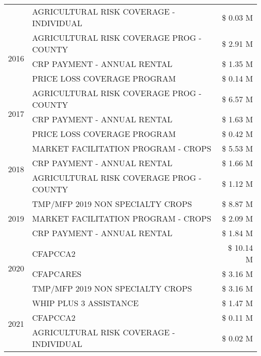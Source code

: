 \begin{tabular}{llr}
 & AGRICULTURAL RISK COVERAGE - INDIVIDUAL & \$ 0.03 M \\
\cline{1-3}
\multirow[t]{3}{*}{2016} & AGRICULTURAL RISK COVERAGE PROG - COUNTY & \$ 2.91 M \\
 & CRP PAYMENT - ANNUAL RENTAL & \$ 1.35 M \\
 & PRICE LOSS COVERAGE PROGRAM & \$ 0.14 M \\
\cline{1-3}
\multirow[t]{3}{*}{2017} & AGRICULTURAL RISK COVERAGE PROG - COUNTY & \$ 6.57 M \\
 & CRP PAYMENT - ANNUAL RENTAL & \$ 1.63 M \\
 & PRICE LOSS COVERAGE PROGRAM & \$ 0.42 M \\
\cline{1-3}
\multirow[t]{3}{*}{2018} & MARKET FACILITATION PROGRAM - CROPS & \$ 5.53 M \\
 & CRP PAYMENT - ANNUAL RENTAL & \$ 1.66 M \\
 & AGRICULTURAL RISK COVERAGE PROG - COUNTY & \$ 1.12 M \\
\cline{1-3}
\multirow[t]{3}{*}{2019} & TMP/MFP 2019 NON SPECIALTY CROPS & \$ 8.87 M \\
 & MARKET FACILITATION PROGRAM - CROPS & \$ 2.09 M \\
 & CRP PAYMENT - ANNUAL RENTAL & \$ 1.84 M \\
\cline{1-3}
\multirow[t]{3}{*}{2020} & CFAPCCA2 & \$ 10.14 M \\
 & CFAPCARES & \$ 3.16 M \\
 & TMP/MFP 2019 NON SPECIALTY CROPS & \$ 3.16 M \\
\cline{1-3}
\multirow[t]{3}{*}{2021} & WHIP PLUS 3 ASSISTANCE & \$ 1.47 M \\
 & CFAPCCA2 & \$ 0.11 M \\
 & AGRICULTURAL RISK COVERAGE - INDIVIDUAL & \$ 0.02 M \\
\cline{1-3}
\bottomrule
\end{tabular}
